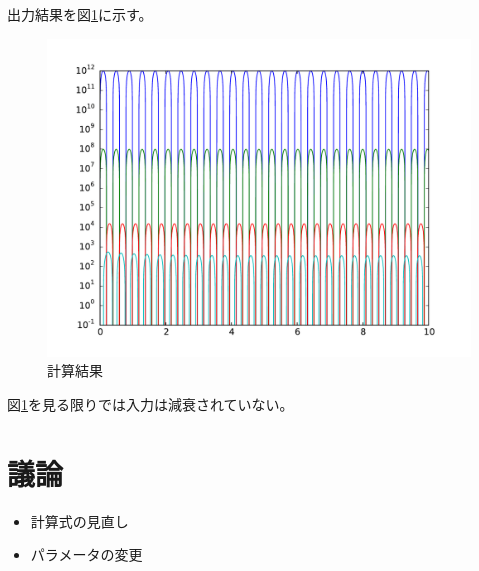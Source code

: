 \documentclass[]{jsarticle}
\begin{document}
出力結果を図\ref{result}に示す。
\begin{figure}
\centering
\includegraphics[width=130mm]{./image/result.pdf}
\caption{計算結果}
\label{result}
\end{figure}

図\ref{result}を見る限りでは入力は減衰されていない。

\section{議論}
\begin{itemize}
\item 計算式の見直し
\item パラメータの変更
\end{itemize}
\end{document}
